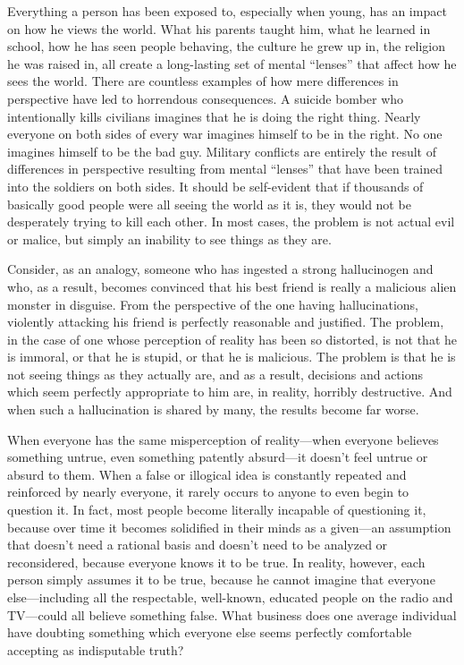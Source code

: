 \documentclass{book}
\begin{document}
Everything a person has been exposed to, especially when young, has an impact on how he views the world. What his parents taught him, what he learned in school, how he has seen people behaving, the culture he grew up in, the religion he was raised in, all create a long-lasting set of mental \enquote{lenses} that affect how he sees the world. There are countless examples of how mere differences in perspective have led to horrendous consequences. A suicide bomber who intentionally kills civilians imagines that he is doing the right thing. Nearly everyone on both sides of every war imagines himself to be in the right. No one imagines himself to be the bad guy. Military conflicts are entirely the result of differences in perspective resulting from mental \enquote{lenses} that have been trained into the soldiers on both sides. It should be self-evident that if thousands of basically good people were all seeing the world as it is, they would not be desperately trying to kill each other. In most cases, the problem is not actual evil or malice, but simply an inability to see things as they are.

Consider, as an analogy, someone who has ingested a strong hallucinogen and who, as a result, becomes convinced that his best friend is really a malicious alien monster in disguise. From the perspective of the one having hallucinations, violently attacking his friend is perfectly reasonable and justified. The problem, in the case of one whose perception of reality has been so distorted, is not that he is immoral, or that he is stupid, or that he is malicious. The problem is that he is not seeing things as they actually are, and as a result, decisions and actions which seem perfectly appropriate to him are, in reality, horribly destructive. And when such a hallucination is shared by many, the results become far worse.

When everyone has the same misperception of reality---when everyone believes something untrue, even something patently absurd---it doesn't feel untrue or absurd to them. When a false or illogical idea is constantly repeated and reinforced by nearly everyone, it rarely occurs to anyone to even begin to question it. In fact, most people become literally incapable of questioning it, because over time it becomes solidified in their minds as a given---an assumption that doesn't need a rational basis and doesn't need to be analyzed or reconsidered, because everyone knows it to be true. In reality, however, each person simply assumes it to be true, because he cannot imagine that everyone else---including all the respectable, well-known, educated people on the radio and TV---could all believe something false. What business does one average individual have doubting something which everyone else seems perfectly comfortable accepting as indisputable truth?
\end{document}
